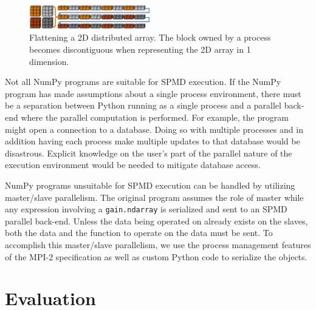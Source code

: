 \documentclass{sigplanconf}
\begin{document}
\begin{figure}[htb]
\centering
\includegraphics[width=0.47\textwidth]{image6_crop.eps}
\caption{
Flattening a 2D distributed array. The block owned by a process becomes
discontiguous when representing the 2D array in 1 dimension.
}
\label{fig:flatten}
\end{figure}

Not all NumPy programs are suitable for SPMD execution. If the NumPy program
has made assumptions about a single process environment, there must be a
separation between Python running as a single process and a parallel back-end
where the parallel computation is performed. For example, the program might
open a connection to a database. Doing so with multiple processes and in
addition having each process make multiple updates to that database would be
disastrous. Explicit knowledge on the user’s part of the parallel nature of
the execution environment would be needed to mitigate database access.

NumPy programs unsuitable for SPMD execution can be handled by utilizing
master/slave parallelism. The original program assumes the role of master
while any expression involving a \texttt{gain.ndarray} is serialized and sent
to an SPMD parallel back-end. Unless the data being operated on already exists
on the slaves, both the data and the function to operate on the data must be
sent. To accomplish this master/slave parallelism, we use the process
management features of the MPI-2 specification as well as custom Python code
to serialize the objects.

\section{Evaluation}
\end{document}
